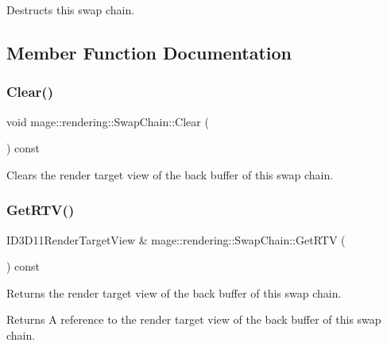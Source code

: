 Destructs this swap chain. 

\subsection{Member Function Documentation}
\mbox{\label{classmage_1_1rendering_1_1_swap_chain_ab834da2afc837fe4c113f86c300af264}} 
\subsubsection{\texorpdfstring{Clear()}{Clear()}}
{\footnotesize\ttfamily void mage\+::rendering\+::\+Swap\+Chain\+::\+Clear (\begin{DoxyParamCaption}{ }\end{DoxyParamCaption}) const\hspace{0.3cm}{\ttfamily [noexcept]}}

Clears the render target view of the back buffer of this swap chain. \mbox{\label{classmage_1_1rendering_1_1_swap_chain_ab7ef5f87f1870777bdb230e51ebdae96}} 
\subsubsection{\texorpdfstring{Get\+R\+T\+V()}{GetRTV()}}
{\footnotesize\ttfamily I\+D3\+D11\+Render\+Target\+View \& mage\+::rendering\+::\+Swap\+Chain\+::\+Get\+R\+TV (\begin{DoxyParamCaption}{ }\end{DoxyParamCaption}) const\hspace{0.3cm}{\ttfamily [noexcept]}}

Returns the render target view of the back buffer of this swap chain.

\begin{DoxyReturn}{Returns}
A reference to the render target view of the back buffer of this swap chain. 
\end{DoxyReturn}
\mbox{\label{classmage_1_1rendering_1_1_swap_chain_ab140a96957564646ec81eabaa6ea7522}} 
